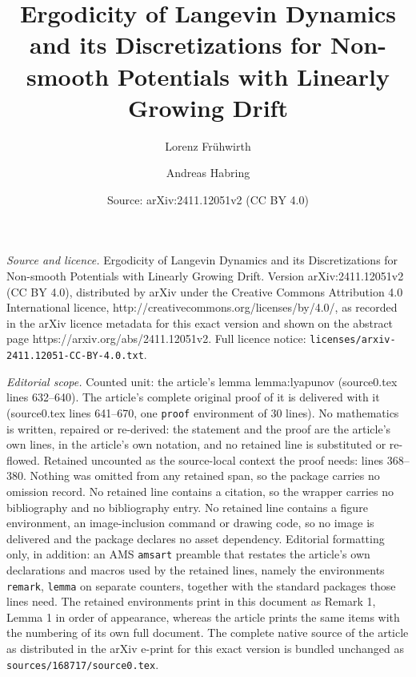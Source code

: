 \documentclass[10pt,a4paper]{amsart}
\title{Ergodicity of Langevin Dynamics and its Discretizations for Non-smooth Potentials with Linearly Growing Drift}
\author{Lorenz Frühwirth \and Andreas Habring}
\date{Source: arXiv:2411.12051v2 (CC BY 4.0)}
\begin{document}
\maketitle

\noindent\emph{Source and licence.} Ergodicity of Langevin Dynamics and its Discretizations for Non-smooth Potentials with Linearly Growing Drift. Version arXiv:2411.12051v2 (CC BY 4.0), distributed by arXiv under the Creative Commons Attribution 4.0 International licence, http://creativecommons.org/licenses/by/4.0/, as recorded in the arXiv licence metadata for this exact version and shown on the abstract page https://arxiv.org/abs/2411.12051v2. Full licence notice: \texttt{licenses/arxiv-2411.12051-CC-BY-4.0.txt}.\par\smallskip

\noindent\textit{Editorial scope.} Counted unit: the article's lemma lemma:lyapunov (source0.tex lines 632--640). The article's complete original proof of it is delivered with it (source0.tex lines 641--670, one \texttt{proof} environment of 30 lines). No mathematics is written, repaired or re-derived: the statement and the proof are the article's own lines, in the article's own notation, and no retained line is substituted or re-flowed.  Retained uncounted as the source-local context the proof needs: lines 368--380.  Nothing was omitted from any retained span, so the package carries no omission record.  No retained line contains a citation, so the wrapper carries no bibliography and no bibliography entry.  No retained line contains a figure environment, an image-inclusion command or drawing code, so no image is delivered and the package declares no asset dependency.  Editorial formatting only, in addition: an AMS \texttt{amsart} preamble that restates the article's own declarations and macros used by the retained lines, namely the environments \texttt{remark}, \texttt{lemma} on separate counters, together with the standard packages those lines need.  The retained environments print in this document as Remark 1, Lemma 1 in order of appearance, whereas the article prints the same items with the numbering of its own full document.  The complete native source of the article as distributed in the arXiv e-print for this exact version is bundled unchanged as \texttt{sources/168717/source0.tex}.
\end{document}
